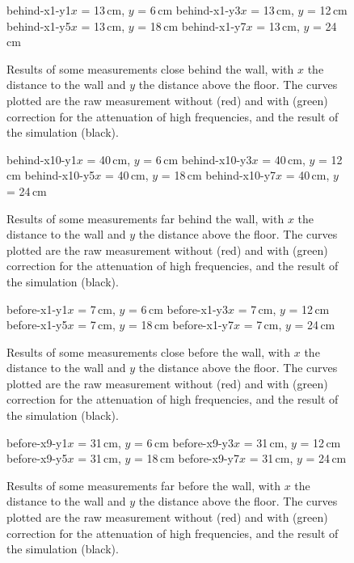 \begin{figure}
\figOctaveTwoNoFigNoCaption{-0.0cm}
	{behind-x1-y1}{$x$ = 13\,cm, $y$ = 6\,cm}
	{behind-x1-y3}{$x$ = 13\,cm, $y$ = 12\,cm}
\figOctaveTwoNoFigNoCaption{-0.0cm}
	{behind-x1-y5}{$x$ = 13\,cm, $y$ = 18\,cm}
	{behind-x1-y7}{$x$ = 13\,cm, $y$ = 24\,cm}
\caption{Results of some measurements close behind the wall, with $x$ the distance to the wall and $y$ the distance above the floor. The curves plotted are the raw measurement without (red) and with (green) correction for the attenuation of high frequencies, and the result of the simulation (black). \label{behindNear}}
\end{figure}

\begin{figure}
\figOctaveTwoNoFigNoCaption{-0.0cm}
	{behind-x10-y1}{$x$ = 40\,cm, $y$ = 6\,cm}
	{behind-x10-y3}{$x$ = 40\,cm, $y$ = 12\,cm}
\figOctaveTwoNoFigNoCaption{-0.0cm}
	{behind-x10-y5}{$x$ = 40\,cm, $y$ = 18\,cm}
	{behind-x10-y7}{$x$ = 40\,cm, $y$ = 24\,cm}
\caption{Results of some measurements far behind the wall, with $x$ the distance to the wall and $y$ the distance above the floor. The curves plotted are the raw measurement without (red) and with (green) correction for the attenuation of high frequencies, and the result of the simulation (black). \label{behindFar}}
\end{figure}




\begin{figure}
\figOctaveTwoNoFigNoCaption{-0.0cm}
	{before-x1-y1}{$x$ = 7\,cm, $y$ = 6\,cm}
	{before-x1-y3}{$x$ = 7\,cm, $y$ = 12\,cm}
\figOctaveTwoNoFigNoCaption{-0.0cm}
	{before-x1-y5}{$x$ = 7\,cm, $y$ = 18\,cm}
	{before-x1-y7}{$x$ = 7\,cm, $y$ = 24\,cm}
\caption{Results of some measurements close before the wall, with $x$ the distance to the wall and $y$ the distance above the floor. The curves plotted are the raw measurement without (red) and with (green) correction for the attenuation of high frequencies, and the result of the simulation (black). \label{behindNear}}
\end{figure}

\begin{figure}
\figOctaveTwoNoFigNoCaption{-0.0cm}
	{before-x9-y1}{$x$ = 31\,cm, $y$ = 6\,cm}
	{before-x9-y3}{$x$ = 31\,cm, $y$ = 12\,cm}
\figOctaveTwoNoFigNoCaption{-0.0cm}
	{before-x9-y5}{$x$ = 31\,cm, $y$ = 18\,cm}
	{before-x9-y7}{$x$ = 31\,cm, $y$ = 24\,cm}
\caption{Results of some measurements far before the wall, with $x$ the distance to the wall and $y$ the distance above the floor. The curves plotted are the raw measurement without (red) and with (green) correction for the attenuation of high frequencies, and the result of the simulation (black). \label{behindFar}}
\end{figure}


